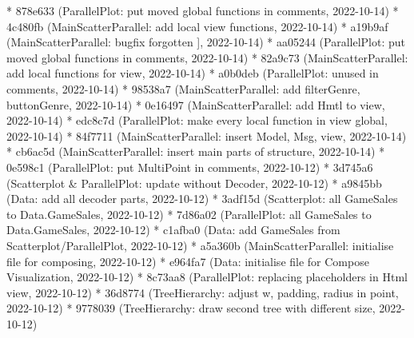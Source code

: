 \documentclass[usegeometry=true]{scrartcl}
\begin{document}
* 878e633 (ParallelPlot: put moved global functions in comments, 2022-10-14) \newline
* 4c480fb (MainScatterParallel: add local view functions, 2022-10-14) \newline
* a19b9af (MainScatterParallel: bugfix forgotten ], 2022-10-14)\newline
* aa05244 (ParallelPlot: put moved global functions in comments, 2022-10-14) \newline
* 82a9c73 (MainScatterParallel: add local functions for view, 2022-10-14)\newline
* a0b0deb (ParallelPlot: unused in comments, 2022-10-14)\newline
* 98538a7 (MainScatterParallel: add filterGenre, buttonGenre, 2022-10-14)\newline
* 0e16497 (MainScatterParallel: add Hmtl to view, 2022-10-14)\newline
* edc8c7d (ParallelPlot: make every local function in view global, 2022-10-14)\newline
* 84f7711 (MainScatterParallel: insert Model, Msg, view, 2022-10-14)\newline
* cb6ac5d (MainScatterParallel: insert main parts of structure, 2022-10-14)\newline
* 0e598c1 (ParallelPlot: put MultiPoint in comments, 2022-10-12)\newline
* 3d745a6 (Scatterplot \& ParallelPlot: update without Decoder, 2022-10-12)\newline
* a9845bb (Data: add all decoder parts, 2022-10-12)\newline
* 3adf15d (Scatterplot: all GameSales to Data.GameSales, 2022-10-12) \newline
* 7d86a02 (ParallelPlot: all GameSales to Data.GameSales, 2022-10-12)\newline
* c1afba0 (Data: add GameSales from Scatterplot/ParallelPlot, 2022-10-12)\newline
* a5a360b (MainScatterParallel: initialise file for composing, 2022-10-12) \newline
* e964fa7 (Data: initialise file for Compose Visualization, 2022-10-12)\newline
* 8c73aa8 (ParallelPlot: replacing placeholders in Html view, 2022-10-12)\newline
* 36d8774 (TreeHierarchy: adjust w, padding, radius in point, 2022-10-12)\newline
* 9778039 (TreeHierarchy: draw second tree with different size, 2022-10-12)\newline
\end{document}
